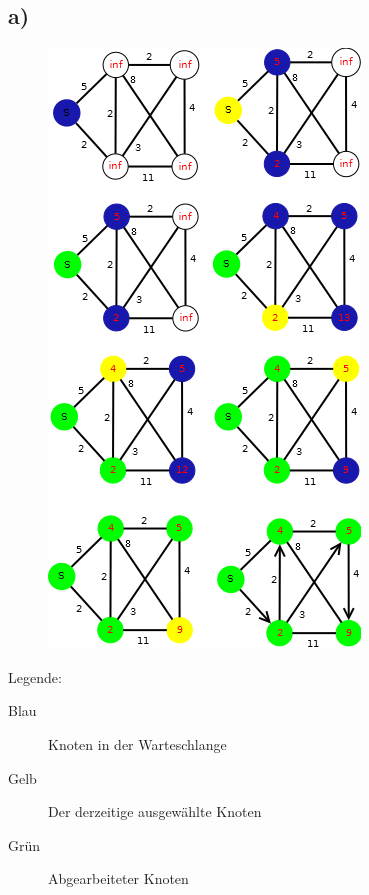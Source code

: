 \documentclass[a4paper,11pt,twoside]{scrartcl}
\begin{document}
\subsection*{a)}
\vspace*{-50pt}
\begin{figure}[H]
	\centering
	\includegraphics*[scale=0.65]{Bilder/2a_Dijkstra}
\end{figure}
Legende:
\begin{description}
	\item[Blau] Knoten in der Warteschlange
	\item[Gelb] Der derzeitige ausgewählte Knoten
	\item[Grün] Abgearbeiteter Knoten
\end{description}
\end{document}
